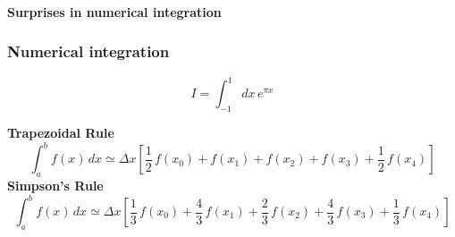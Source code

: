 \begin{frame}
  \frametitle{}
  \begin{center}
    \textbf{\Large Surprises in numerical integration }
  \end{center}
\end{frame}


\begin{frame}
  \frametitle{Numerical integration\\
  }
 \begin{tcolorbox}
  \begin{equation*}
    I = \int_{-1}^{1} dx \, e^{\pi x} 
  \end{equation*}
 \end{tcolorbox}
 \pause
  \textbf{Trapezoidal Rule}
  \begin{equation*}
    \int_{a}^{b} f(x) \, dx \simeq 
    \Delta x \left[ \frac{1}{2} \, f(x_0) + f(x_1) + f(x_2) + f(x_3) +  \frac{1}{2}  \,f(x_4) \right]
  \end{equation*}
  \textbf{Simpson's Rule}
  \begin{equation*}
    \int_{a}^{b} f(x) \, dx \simeq 
    \Delta x \left[ \frac{1}{3}  \,f(x_0) + \frac{4}{3}  \,f(x_1) + \frac{2}{3}  \,f(x_2)
      + \frac{4}{3}  \,f(x_3) + \frac{1}{3}  \, f(x_4) \right]
  \end{equation*}
\end{frame}


